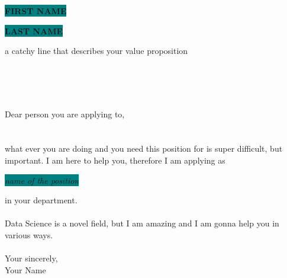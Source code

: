 \documentclass[8pt]{developercv}
\begin{document}
\begin{minipage}[t]{0.725\textwidth} 
	\vspace{-\baselineskip}
	\colorbox{teal}{{\HUGE\textcolor{t4v_white}{\textbf{\MakeUppercase{First Name}}}}}
	
	\colorbox{teal}{{\HUGE\textcolor{t4v_white}{\textbf{\MakeUppercase{Last Name}}}}} 
	
	\vspace{6pt}
	
	{\large a catchy line that describes your value proposition} 
\end{minipage}
\begin{minipage}[t]{0.275\textwidth} 
	\vspace{-\baselineskip}
	\\
	\\
	\\
\end{minipage}

\vspace{3cm}

\LARGE

Dear person you are applying to,\\
\\
\\
what ever you are doing and you need this position for is super difficult, but important. I am here to help you, therefore I am applying as
\begin{center}
\colorbox{teal}{{\textcolor{t4v_white}{\textit{{name of the position}}}}}
\end{center}
in your department.\\
\\
Data Science is a novel field, but I am amazing and I am gonna help you in various ways.
\\
\\
Your sincerely,\\
Your Name
\end{document}
